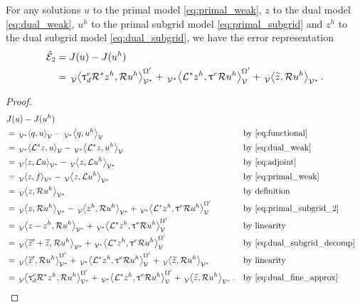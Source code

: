 \begin{prop}
For any solutions $u$ to the primal model \eqref{eq:primal_weak},
$z$ to the dual model \eqref{eq:dual_weak}, $u^h$ to the primal
subgrid model \eqref{eq:primal_subgrid} and $z^h$ to the dual
subgrid model \eqref{eq:dual_subgrid}, we have the error
representation
%
\begin{gather}
\begin{aligned}
\hat{\mathcal{E}}_2 &= J(u) - J(u^h) \\
&=
\,{}_{\mathcal{V}}^{}\!\left< {\uptau^e_d \mathcal{R}^* z^h}, {\mathcal{R} u^h} \right>_{\mathcal{V}^*}^{\Omega'} +
\,{}_{\mathcal{V}^*}^{}\!\left< {\mathcal{L}^* z^h}, {\uptau^e \mathcal{R} u^h} \right>_{\mathcal{V}}^{\Omega'} +
\,{}_{\mathcal{V}}^{}\!\left< {\widetilde{z}}, {\mathcal{R} u^h} \right>_{\mathcal{V}^*}.
\end{aligned}
\label{eq:representation_2}
\end{gather}
%
\end{prop}

\begin{proof}
\begin{gather*}
\begin{aligned}
&J(u) - J(u^h) \\
&=
\paira{q}{u} - \paira{q}{u^h}
&& \text{by \eqref{eq:functional}} \\
&=
\paira{\OP^* z}{u} - \paira{\OP^* z}{u^h}
&& \text{by \eqref{eq:dual_weak}} \\
& =
\pairb{z}{\OP u} - \pairb{z}{\OP u^h}
&& \text{by \eqref{eq:adjoint}} \\
&=
\pairb{z}{f} - \pairb{z}{\OP u^h}
&& \text{by \eqref{eq:primal_weak}} \\
&=
\pairb{z}{\R u^h}
&& \text{by definition} \\
&=
\pairb{z}{\R u^h} - \pairb{z^h}{\R u^h} +
\paira{\OP^* z^h}{\uptau^e \R u^h}^{\Omega'}
&& \text{by \eqref{eq:primal_subgrid_2}} \\
&=
\pairb{z - z^h}{\R u^h} +
\paira{\OP^* z^h}{\uptau^e \R u^h}^{\Omega'}
&& \text{by linearity} \\
&=
\pairb{\tilde{z}' + \tilde{z}}{\R u^h} +
\paira{\OP^* z^h}{\uptau^e \R u^h}^{\Omega'}
&& \text{by \eqref{eq:dual_subgrid_decomp}} \\
&=
\pairb{\tilde{z}'}{\R u^h}^{\Omega'} +
\paira{\OP^* z^h}{\uptau^e \R u^h}^{\Omega'} +
\pairb{\tilde{z}}{ \R u^h}
&& \text{by linearity} \\
&=
\pairb{\uptau^e_d \R^* z^h}{\R u^h}^{\Omega'} +
\paira{\OP^* z^h}{\uptau^e \R u^h}^{\Omega'} +
\pairb{\tilde{z}}{ \R u^h}.
&& \text{by \eqref{eq:dual_fine_approx}}
\end{aligned}
\end{gather*}
\end{proof}

